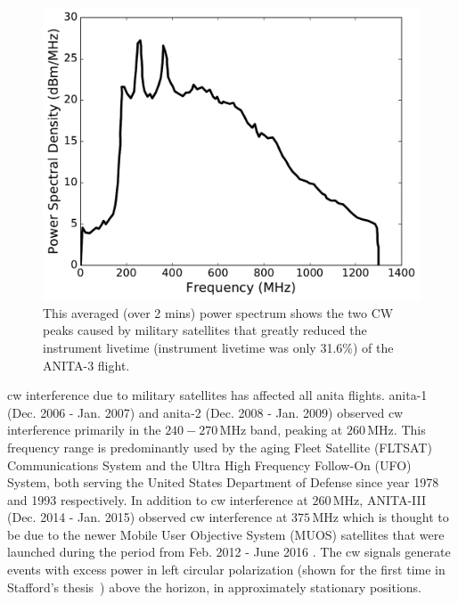 \begin{figure}
\centering
\includegraphics[width=1.0\textwidth]{figures/anita3spectra_wais_replot.pdf}
\caption{This averaged (over 2 mins) power spectrum shows the two CW peaks caused by military satellites that greatly reduced the instrument livetime (instrument livetime was only 31.6\%) of the ANITA-3 flight.}
\label{cw_peaks}
\end{figure}

\gls{cw} interference due to military satellites has affected all \gls{anita} flights.
\gls{anita}-1 (Dec. 2006 - Jan. 2007) and \gls{anita}-2 (Dec. 2008 - Jan. 2009) observed \gls{cw} interference primarily in the $240-270\,\mbox{MHz}$ band, peaking
at $260\,\mbox{MHz}$. This frequency range is predominantly used by the aging Fleet Satellite (FLTSAT) Communications System 
and the Ultra High Frequency Follow-On (UFO) System, both serving the 
United States Department of Defense since year 1978 and 1993 respectively.
In addition to \gls{cw} interference at $260\,\mbox{MHz}$, ANITA-III (Dec. 2014 - Jan. 2015) observed \gls{cw} interference at $375\,\mbox{MHz}$
which is thought to be due to
the newer Mobile User Objective System (MUOS) satellites that were launched during the period from Feb. 2012 - June 2016 \cite{milsat}.
The \gls{cw} signals generate events with excess power in left circular polarization (shown for the first time in Stafford's thesis~\cite{samStaffordThesis}) above the horizon, in approximately stationary positions.

